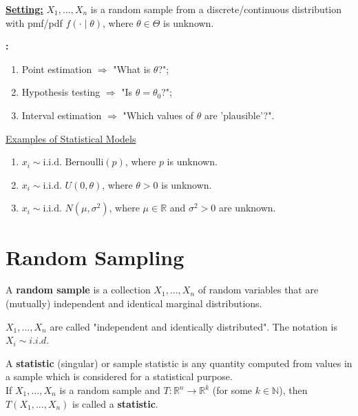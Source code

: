 \documentclass[11pt]{elegantbook}
\begin{document}
\textbf{\underline{Setting:}} $X_1,...,X_n$ is a random sample from a discrete/continuous distribution with pmf/pdf $f(\cdot\mid \theta)$, where $\theta\in\Theta$ is unknown.

\textbf{:}
\begin{enumerate}[$\circ$]
    \item Point estimation $\Rightarrow$ "What is $\theta$?";
    \item Hypothesis testing $\Rightarrow$ "Is $\theta=\theta_0$?";
    \item Interval estimation $\Rightarrow$ "Which values of $\theta$ are 'plausible'?".
\end{enumerate}

\begin{example}
    \underline{Examples of Statistical Models}
    \begin{enumerate}[(1).]
        \item $x_i\sim \text{i.i.d. } \text{Bernoulli}(p)$, where $p$ is unknown.
        \item $x_i\sim \text{i.i.d. } U(0,\theta)$, where $\theta>0$ is unknown.
        \item $x_i\sim \text{i.i.d. } N(\mu,\sigma^2)$, where $\mu\in \mathbb{R}$ and $\sigma^2>0$ are unknown.
    \end{enumerate}
\end{example}
\section{Random Sampling}
\begin{definition}
    \normalfont
    A \textbf{random sample} is a collection $X_1,...,X_n$ of random variables that are (mutually) independent and identical marginal distributions.

    $X_1,...,X_n$ are called "independent and identically distributed". The notation is $X_i\sim i.i.d. $
\end{definition}

\begin{definition}[Statistic]
    \normalfont
    A \textbf{statistic} (singular) or sample statistic is any quantity computed from values in a sample which is considered for a statistical purpose.\\
    If $X_1,...,X_n$ is a random sample and $T: \mathbb{R}^n \rightarrow \mathbb{R}^k$ (for some $k\in \mathbb{N}$), then $T(X_1,...,X_n)$ is called a \textbf{statistic}.
\end{definition}
\end{document}
